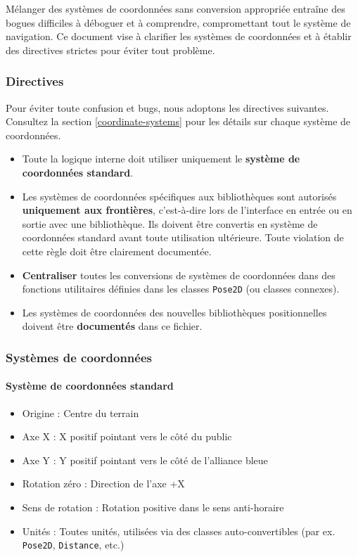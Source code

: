 \documentclass[12pt, a4paper]{report}
\begin{document}
    Mélanger des systèmes de coordonnées sans conversion appropriée entraîne des bogues difficiles à déboguer et à comprendre, compromettant tout le système de navigation. Ce document vise à clarifier les systèmes de coordonnées et à établir des directives strictes pour éviter tout problème.

    \subsubsection*{Directives}

    Pour éviter toute confusion et bugs, nous adoptons les directives suivantes. Consultez la section \ref{coordinate-systems} pour les détails sur chaque système de coordonnées.

    \begin{itemize}
        \item Toute la logique interne doit utiliser uniquement le \textbf{système de coordonnées standard}.
        \item Les systèmes de coordonnées spécifiques aux bibliothèques sont autorisés \textbf{uniquement aux frontières}, c'est-à-dire lors de l'interface en entrée ou en sortie avec une bibliothèque. Ils doivent être convertis en système de coordonnées standard avant toute utilisation ultérieure. Toute violation de cette règle doit être clairement documentée.
        \item \textbf{Centraliser} toutes les conversions de systèmes de coordonnées dans des fonctions utilitaires définies dans les classes \texttt{Pose2D} (ou classes connexes).
        \item Les systèmes de coordonnées des nouvelles bibliothèques positionnelles doivent être \textbf{documentés} dans ce fichier.
    \end{itemize}

    \subsubsection*{Systèmes de coordonnées}
    \label{coordinate-systems}

    \paragraph{Système de coordonnées standard}

    \begin{itemize}
        \item Origine : Centre du terrain
        \item Axe X : X positif pointant vers le côté du public
        \item Axe Y : Y positif pointant vers le côté de l'alliance bleue
        \item Rotation zéro : Direction de l'axe +X
        \item Sens de rotation : Rotation positive dans le sens anti-horaire
        \item Unités : Toutes unités, utilisées via des classes auto-convertibles (par ex. \texttt{Pose2D}, \texttt{Distance}, etc.)
    \end{itemize}
\end{document}
